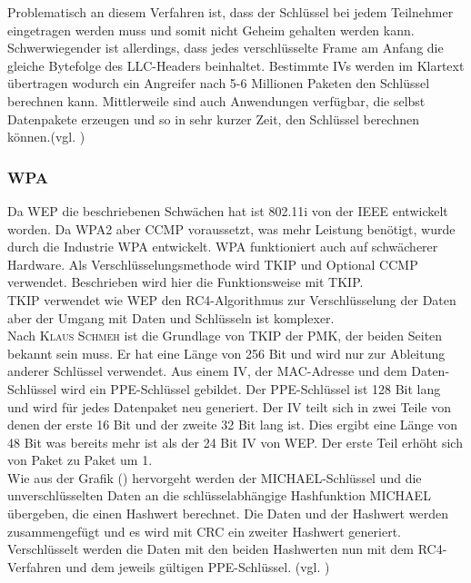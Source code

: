 Problematisch an diesem Verfahren ist, dass der Schlüssel bei jedem Teilnehmer eingetragen werden muss und somit nicht Geheim gehalten werden kann. Schwerwiegender ist allerdings, dass jedes verschlüsselte Frame am Anfang die gleiche Bytefolge des \ac{LLC}-Headers beinhaltet. Bestimmte \acp{IV} werden im Klartext übertragen wodurch ein Angreifer nach 5-6 Millionen Paketen den Schlüssel berechnen kann. Mittlerweile sind auch Anwendungen verfügbar, die selbst Datenpakete erzeugen und so in sehr kurzer Zeit, den Schlüssel berechnen können.(vgl. \cite{SWB-430171331})

\subsubsection{\ac{WPA}} 
Da \ac{WEP} die beschriebenen Schwächen hat ist 802.11i von der \ac{IEEE} entwickelt worden. Da \ac{WPA2} aber \ac{CCMP} voraussetzt, was mehr Leistung benötigt, wurde durch die Industrie \ac{WPA} entwickelt. \ac{WPA} funktioniert auch auf schwächerer Hardware. Als Verschlüsselungsmethode wird \ac{TKIP} und Optional \ac{CCMP} verwendet. Beschrieben wird hier die Funktionsweise mit \ac{TKIP}. \\
\ac{TKIP} verwendet wie \ac{WEP} den RC4-Algorithmus zur Verschlüsselung der Daten aber der Umgang mit Daten und Schlüsseln ist komplexer. \\
Nach \textsc{Klaus Schmeh} \cite{SWB-378541420} ist die Grundlage von \ac{TKIP} der \ac{PMK}, der beiden Seiten bekannt sein muss. Er hat eine Länge von 256 Bit und wird nur zur Ableitung anderer Schlüssel verwendet. Aus einem \ac{IV}, der MAC-Adresse und dem Daten-Schlüssel wird ein \ac{PPE}-Schlüssel gebildet. Der \ac{PPE}-Schlüssel ist 128 Bit lang und wird für jedes Datenpaket neu generiert.
Der \ac{IV} teilt sich in zwei Teile von denen der erste 16 Bit und der zweite 32 Bit lang ist. Dies ergibt eine Länge von 48 Bit was bereits mehr ist als der 24 Bit \ac{IV} von WEP. Der erste Teil erhöht sich von Paket zu Paket um 1.\\
Wie aus der Grafik () hervorgeht werden der MICHAEL-Schlüssel und die unverschlüsselten Daten an die schlüsselabhängige Hashfunktion MICHAEL übergeben, die einen Hashwert berechnet. Die Daten und der Hashwert werden zusammengefügt und es wird mit CRC ein zweiter Hashwert generiert. Verschlüsselt werden die Daten mit den beiden Hashwerten nun mit dem RC4-Verfahren und dem jeweils gültigen \ac{PPE}-Schlüssel. (vgl. \cite{SWB-378541420})

